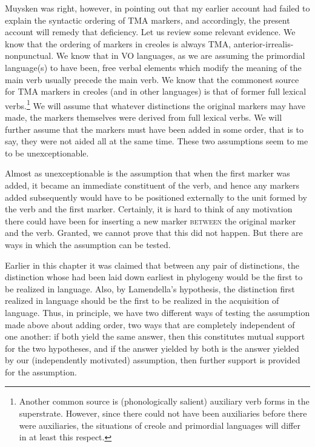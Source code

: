 Muysken was right, however, in pointing out that my earlier account had failed to explain the syntactic ordering of TMA markers, and accordingly, the present account will remedy that deficiency. Let us review some relevant evidence. We know that the ordering of markers in creoles is always TMA, anterior-irrealis-nonpunctual. We know that in VO languages, as we are assuming the primordial language(s) to have been, free verbal elements which modify the meaning of the main verb usually precede the main verb. We know that the commonest source for TMA markers in creoles (and in other languages) is that of former full lexical verbs.\footnote{Another common source is (phonologically salient) auxiliary verb forms in the superstrate. However, since there could not have been auxiliaries before there were auxiliaries, the situations of creole and primordial languages will differ in at least this respect.} We will assume that whatever distinctions the original markers may have made, the markers themselves were derived from full lexical verbs. We will further assume that the markers must have been added in some order, that is to say, they were not aided all at the same time. These two assumptions seem to me to be unexceptionable.

Almost as unexceptionable is the assumption that when the first marker was added, it became an immediate constituent of the verb, and hence any markers added subsequently would have to be positioned externally to the unit formed by the verb and the first marker. Certainly, it is hard to think of any motivation there could have been for inserting a new marker \textsc{between} the original marker and the verb. Granted, we cannot prove that this did not happen. But there are ways in which the assumption can be tested.

Earlier in this chapter it was claimed that between any pair of distinctions, the distinction whose  had been laid down earliest in phylogeny would be the first to be realized in language.
Also, by Lamendella's hypothesis, the distinction first realized in language should be the first to be realized in the acquisition of language. Thus, in principle, we have two different ways of testing the assumption made above about adding order, two ways that are completely independent of one another: if both yield the same answer, then this constitutes mutual support for the two hypotheses, and if the answer yielded by both is the answer yielded by our (independently motivated) assumption, then further support is provided for the assumption.

